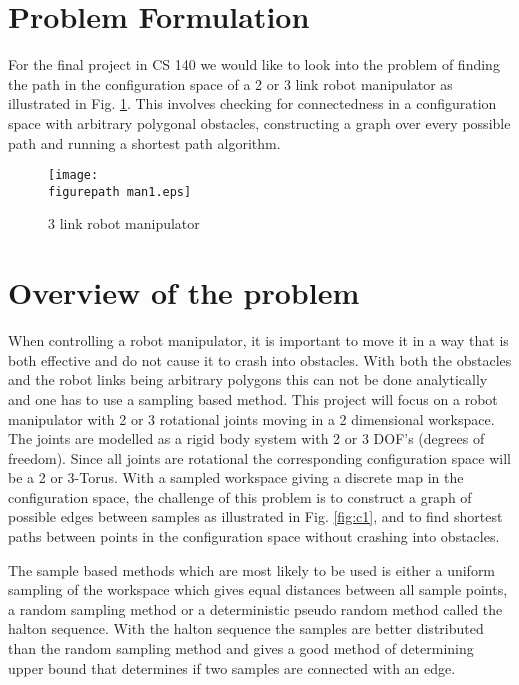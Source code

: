 \newcommand{\figurepath}{./figures/}
\newcommand{\figurescale}{0.6}
\newcommand{\codepath}{../matlab/}
\setlength\parindent{24pt}

\section*{Problem Formulation}
For the final project in CS 140 we would like to look into the problem of finding the  path in the configuration space of a 2 or 3 link robot manipulator as illustrated in Fig. \ref{fig:man1}. This involves checking for connectedness in a configuration space with arbitrary polygonal obstacles, constructing a graph over every possible path and running a shortest path algorithm. 


\begin{figure}[h!] 
 \center 
 \texttt{[image: \\figurepath man1.eps]}
 \caption{ 3 link robot manipulator \label{fig:man1}}
 \end{figure}

\section*{Overview of the problem}
When controlling a robot manipulator, it is important to move it in a way that is both effective and do not cause it to crash into obstacles. With both the obstacles and the robot links being arbitrary polygons this can not be done analytically and one has to use a sampling based method. This project will focus on a robot manipulator with 2 or 3 rotational joints moving in a 2 dimensional workspace. The joints are modelled as a rigid body system with 2 or 3 DOF's (degrees of freedom). Since all joints are rotational the corresponding configuration space will be a 2 or 3-Torus. With a sampled workspace giving a discrete map in the configuration space, the challenge of this problem is to construct a graph of possible edges between samples as illustrated in Fig. \ref{fig:c1}, and to find shortest paths between points in the configuration space without crashing into obstacles.  
\\
\par 

The sample based methods which are most likely to be used is either a uniform sampling of the workspace which gives equal distances between all sample points, a random sampling method or a deterministic pseudo random method called the halton sequence. With the halton sequence the samples are better distributed than the random sampling method and gives a good method of determining upper bound that determines if two samples are connected with an edge.





